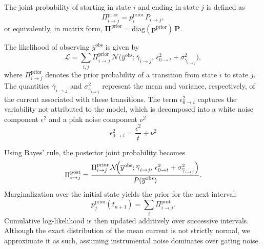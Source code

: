 \documentclass[pdflatex,sn-nature]{sn-jnl}%
\begin{document}
The joint probability of starting in state \(i\) and ending in state \(j\) is defined as
\begin{equation}
	\Pi_{i\rightarrow j}^{\text{prior}} = p_i^{\text{prior}}\,P_{i\rightarrow j},
	\label{eq:joint_state_probability_short}
\end{equation}
or equivalently, in matrix form, \(\boldsymbol{\Pi}^{\text{prior}} = \mathrm{diag}(\boldsymbol{p}^{\text{prior}})\,\mathbf{P}\).

The likelihood of observing $\overline{y}^{\text{obs}}$ is given by
\begin{equation}
	\mathcal{L} = \sum_{i,j} \Pi_{i\rightarrow j}^{\text{prior}}\,\mathcal{N}\!\Biggl(
	\overline{y}^{\text{obs}}; \overline{\gamma}_{i\rightarrow j}, \,
	\epsilon ^2_{0 \rightarrow t}  + \sigma^2_{\overline{\gamma}_{i\rightarrow j}}
	\Biggr),
	\label{eq:integrated_likelihood_short}
\end{equation}
where $\Pi_{i\rightarrow j}^{\text{prior}}$ denotes the prior probability of a transition from state $i$ to state $j$. The quantities $\overline{\gamma}_{i\rightarrow j}$ and $\sigma^2_{\overline{\gamma}_{i\rightarrow j}}$ represent the mean and variance, respectively, of the current associated with these transitions. The term $\epsilon ^2_{0 \rightarrow t}$ captures the variability not attributed to the model, which is decomposed into a white noise component $\epsilon^2$ and a pink noise component $\nu^2$ 
\begin{equation}
	\epsilon ^2_{0 \rightarrow t} = \frac{\epsilon^2}{t} + \nu ^2
	\label{eq:interval_noise}
\end{equation}


Using Bayes' rule, the posterior joint probability becomes
\begin{equation}
	\Pi_{i\rightarrow j}^{\text{post}} = \frac{\Pi_{i\rightarrow j}^{\text{prior}}\,\mathcal{N}\!\Bigl(\overline{y}^{\text{obs}}; \overline{\gamma}_{i\rightarrow j},\, \epsilon ^2_{0 \rightarrow t} + \sigma^2_{\overline{\gamma}_{i\rightarrow j}}\Bigr)}{P(\overline{y}^{\text{obs}})}.
	\label{eq:integrated_posterior_short}
\end{equation}
Marginalization over the initial state yields the prior for the next interval:
\begin{equation}
	p_j^{\text{prior}}(t_{n+1}) = \sum_i \Pi_{i\rightarrow j}^{\text{post}}.
	\label{eq:next_prior_short}
\end{equation}
Cumulative log-likelihood is then updated additively over successive intervals. Although the exact distribution of the mean current is not strictly normal, we approximate it as such, assuming instrumental noise dominates over gating noise.
\end{document}
